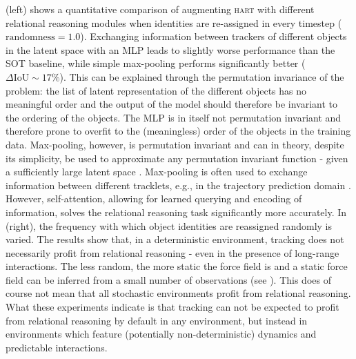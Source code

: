  (left) shows a quantitative comparison of augmenting \textsc{hart} with different relational reasoning modules when identities are re-assigned in every timestep ($\text{randomness} = 1.0$). Exchanging information between trackers of different objects in the latent space with an MLP leads to slightly worse performance than the SOT baseline, while simple max-pooling performs significantly better ($\Delta \text{IoU} \sim 17\%$). This can be explained through the permutation invariance of the problem: the list of latent representation of the different objects has no meaningful order and the output of the model should therefore be invariant to the ordering of the objects. The MLP is in itself not permutation invariant and therefore prone to overfit to the (meaningless) order of the objects in the training data. Max-pooling, however, is permutation invariant and can in theory, despite its simplicity, be used to approximate any permutation invariant function - given a sufficiently large latent space \cite{Zaheer2017,Wagstaff2019}. Max-pooling is often used to exchange information between different tracklets, e.g., in the trajectory prediction domain \cite{Alahi2016social,Gupta2019social}. However, self-attention, allowing for learned querying and encoding of information, solves the relational reasoning task significantly more accurately. In  (right), the frequency with which object identities are reassigned randomly is varied. The results show that, in a deterministic environment, tracking does not necessarily profit from relational reasoning - even in the presence of long-range interactions. The less random, the more static the force field is and a static force field can be inferred from a small number of observations (see ). This does of course not mean that all stochastic environments profit from relational reasoning. What these experiments indicate is that tracking can not be expected to profit from relational reasoning by default in any environment, but instead in environments which feature (potentially non-deterministic) dynamics and predictable interactions.